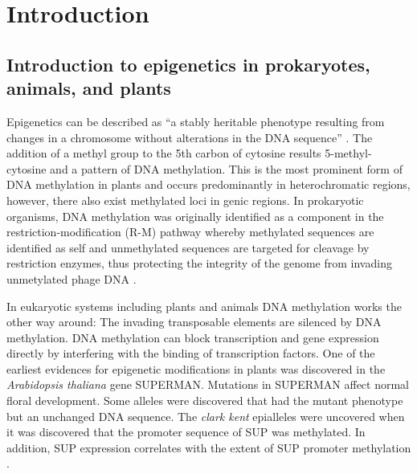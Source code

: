 
\chapter{Introduction}  %

\ifpdf
    \graphicspath{{Chapter1/Figs/Raster/}{Chapter1/Figs/PDF/}{Chapter1/Figs/}}
\else
    \graphicspath{{Chapter1/Figs/Vector/}{Chapter1/Figs/}}
\fi


\section{Introduction to epigenetics in prokaryotes, animals, and plants } %

Epigenetics can be described as “a stably heritable phenotype resulting from changes in a chromosome without alterations in the DNA sequence” \citep{RN135}. The addition of a methyl group to the 5th carbon of cytosine results 5-methyl-cytosine and a pattern of DNA methylation. This is the most prominent form of DNA methylation in plants and occurs predominantly in heterochromatic regions, however, there also exist methylated loci in genic regions. In prokaryotic organisms, DNA methylation was originally identified as a component in the restriction-modification (R-M) pathway whereby methylated sequences are identified as self and unmethylated sequences are targeted for cleavage by restriction enzymes, thus protecting the integrity of the genome from invading unmetylated phage DNA  \citep{RN96,RN95}.

In eukaryotic systems including plants and animals DNA methylation works the other way around: The invading transposable elements are silenced by DNA methylation. DNA methylation can block transcription and gene expression directly by interfering with the binding of transcription factors. One of the earliest evidences for epigenetic modifications in plants was discovered in the \textit{Arabidopsis thaliana} gene SUPERMAN. Mutations in SUPERMAN affect normal floral development. Some alleles were discovered that had the mutant phenotype but an unchanged DNA sequence. The \textit{clark kent} epialleles were uncovered when it was discovered that the promoter sequence of SUP was methylated. In addition, SUP expression correlates with the extent of SUP promoter methylation \citep{RN100}.

